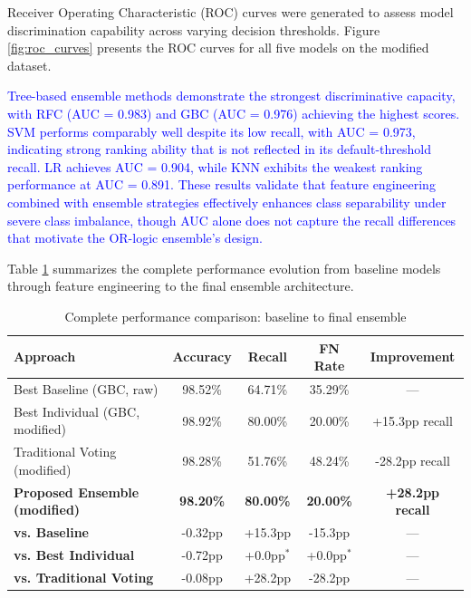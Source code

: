 Receiver Operating Characteristic (ROC) curves were generated to assess model discrimination capability across varying decision thresholds. Figure \ref{fig:roc_curves} presents the ROC curves for all five models on the modified dataset.



\textcolor{blue}{Tree-based ensemble methods demonstrate the strongest discriminative capacity, with RFC (AUC = 0.983) and GBC (AUC = 0.976) achieving the highest scores. SVM performs comparably well despite its low recall, with AUC = 0.973, indicating strong ranking ability that is not reflected in its default-threshold recall. LR achieves AUC = 0.904, while KNN exhibits the weakest ranking performance at AUC = 0.891. These results validate that feature engineering combined with ensemble strategies effectively enhances class separability under severe class imbalance, though AUC alone does not capture the recall differences that motivate the OR-logic ensemble's design.}

Table \ref{tab:final_comparison} summarizes the complete performance evolution from baseline models through feature engineering to the final ensemble architecture.

\begin{table}[htbp]
\centering
\caption{Complete performance comparison: baseline to final ensemble}
\label{tab:final_comparison}
\small
\begin{tabular}{lcccc}
\hline
\textbf{Approach} & \textbf{Accuracy} & \textbf{Recall} & \textbf{FN Rate} & \textbf{Improvement} \\
\hline
Best Baseline (GBC, raw) & 98.52\% & 64.71\% & 35.29\% & --- \\
Best Individual (GBC, modified) & 98.92\% & 80.00\% & 20.00\% & +15.3pp recall \\
Traditional Voting (modified) & 98.28\% & 51.76\% & 48.24\% & -28.2pp recall \\
\textbf{Proposed Ensemble (modified)} & \textbf{98.20\%} & \textbf{80.00\%} & \textbf{20.00\%} & \textbf{+28.2pp recall} \\
\hline
\textbf{vs. Baseline} & -0.32pp & +15.3pp & -15.3pp & --- \\
\textbf{vs. Best Individual} & -0.72pp & +0.0pp$^{*}$ & +0.0pp$^{*}$ & --- \\
\textbf{vs. Traditional Voting} & -0.08pp & +28.2pp & -28.2pp & --- \\
\hline
\end{tabular}
\end{table}

